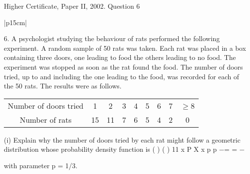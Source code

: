 \documentclass[a4paper,12pt]{article}
\begin{document}
Higher Certificate, Paper II, 2002.  Question 6 
\begin{table}[ht!]
 
\centering
 
\begin{tabular}{|p{15cm}|}
 
\hline  

 
6. A psychologist studying the behaviour of rats performed the following experiment.  A random sample of 50 rats was taken.  Each rat was placed in a box containing three doors, one leading to food the others leading to no food.  The experiment was stopped as soon as the rat found the food.  The number of doors tried, up to and including the one leading to the food, was recorded for each of the 50 rats.  The results were as follows. 

\begin{center}
\begin{tabular}{c|cccccccc|} 
Number of doors tried & 1&  2&  3 & 4 & 5 & 6 & 7 & $\geq$8 \\
Number of rats & 15&  11&  7&  6&  5&  4&  2 & 0\\ 
\end{tabular} 
\end{center}
 
(i) Explain why the number of doors tried by each rat might follow a geometric distribution whose probability density function is  
 ( ) ( ) 11 x P X x p p −= = − 
 
 with parameter p = 1/3. 
\\ \hline
  
\end{tabular}

\end{table}
\end{document}
